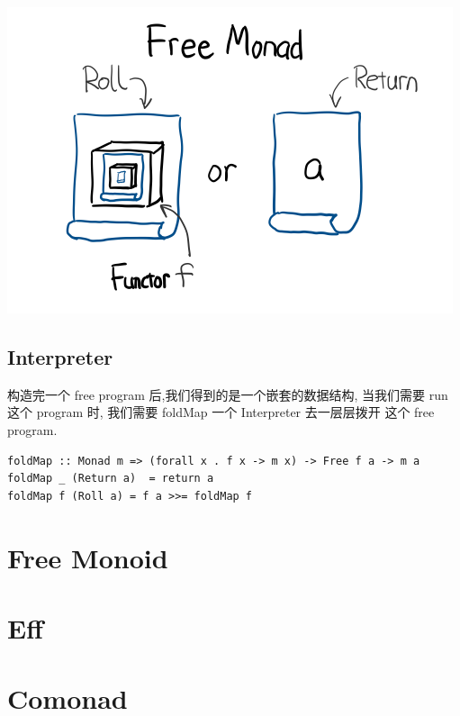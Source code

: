\documentclass[letterspacing]{tufte-book}
\begin{document}
\begin{center}
\includegraphics[width=.9\linewidth]{images/p3-Free.png}
\end{center}

\section{Interpreter}
\label{sec:org66a58c8}
构造完一个 free program 后,我们得到的是一个嵌套的数据结构, 当我们需要 run 这个 program 时, 我们需要 foldMap 一个
Interpreter 去一层层拨开 这个 free program.

\lstset{language=haskell,label= ,caption= ,captionpos=b,numbers=none}
\begin{lstlisting}
foldMap :: Monad m => (forall x . f x -> m x) -> Free f a -> m a
foldMap _ (Return a)  = return a
foldMap f (Roll a) = f a >>= foldMap f
\end{lstlisting}

\chapter{Free Monoid}
\label{sec:orga863419}
\chapter{Eff}
\label{sec:orgef082b8}

\chapter{Comonad}
\label{sec:org058f2f5}
\end{document}
